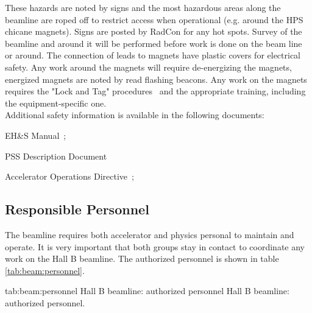 These hazards are noted by signs and the most hazardous areas along the beamline are roped off to restrict access when operational (e.g. around the HPS chicane magnets). Signs are posted by RadCon for any hot spots. Survey of the beamline and around it will be performed before work is done on the beam line or around. The connection of leads to magnets have plastic covers for electrical safety. Any work around the magnets will require de-energizing the magnets, energized magnets are noted by read flashing beacons. Any work on the magnets requires the "Lock and Tag" procedures~\cite{EHScebaf} and the appropriate training, including the equipment-specific one. \\

\noindent{}Additional safety information is available in the following documents:
\begin{list}{--}{\setlength{\itemsep}{-0.15cm}}
  \item EH\&S Manual~\cite{EHScebaf};
  \item PSS Description Document~\cite{PSScebaf}
  \item Accelerator Operations Directive~\cite{AODcebaf};
\end{list}


\begin{safetyen}{10}{15}
\subsection{Responsible  Personnel} 
\end{safetyen}
The beamline requires both accelerator and physics personal to maintain and operate. It is very important that both groups stay in contact to coordinate any work on the Hall B beamline.   The authorized personnel is shown in table \ref{tab:beam:personnel}.
\begin{namestab}{tab:beam:personnel}{ Hall B beamline: authorized personnel}{%
       Hall B beamline: authorized personnel.}
\end{namestab}
